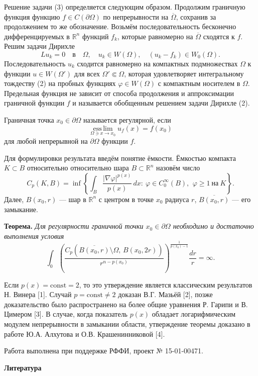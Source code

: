 Решение задачи (3) определяется следующим образом. Продолжим граничную функция функцию $f\in C(\partial \Omega)$ по непрерывности на $\overline{\Omega}$, сохранив за продолжением то же обозначение. Возьмём последовательность бесконечно дифференцируемых в $\mathbb{R}^n$ функций $f_k$, которые равномерно на $\overline{\Omega}$ сходятся к $f$. Решим задачи Дирихле
$$
Lu_k=0 \quad\text{в}\quad \Omega, \quad u_k \in W(\Omega), \quad (u_k-f_k)\in W_0(\Omega).
$$
Последовательность $u_k$ сходится равномерно  на компактных подмножествах $\Omega$ к функции $u\in W(\Omega')$ для всех $\Omega'\Subset \Omega$, которая удовлетворяет интегральному тождеству (2) на пробных функциях $\varphi \in W(\Omega)$ с компактным носителем в $\Omega$. Предельная функция не зависит от способа продолжения и аппроксимации граничной функции $f$ и называется обобщенным решением задачи Дирихле (2).

Граничная точка $x_0\in \partial \Omega$ называется регулярной, если
$$
\mathop{\mathrm{ess\,lim}}\limits_{\Omega \ni x\to x_0} u_f(x)= f(x_0)
$$
для любой непрерывной на $\partial \Omega$ функции $f$.

Для формулировки результата введём понятие ёмкости. Ёмкостью компакта $K\subset B$ относительно относительно шара $B\subset \mathbb{R}^n$ назовём число
$$
C_p (K, B)=\inf \left\{ \int_B \frac{|\nabla \varphi|^{p(x)}}{p(x)}\,dx:\ \varphi\in C_0^\infty(B),\ \,\varphi\geq 1\ \text{на}\ K \right\}.
$$
Далее, $B(x_0,r)$ --- шар в $\mathbb{R}^n$ с центром в точке $x_0$ радиуса $r$, $\overline{B(x_0,r)}$ --- его замыкание.

{\bf Теорема.} {\it Для регулярности граничной точки $x_0\in \partial \Omega$ необходимо и достаточно выполнения условия
$$
\int_0 \left( \frac{C_p \left(\overline{B(x_0,r)}\setminus \Omega,\, B(x_0,2r) \right)}{r^{n-p(x_0)}} \right)^\frac{1}{p(x_0)-1}\frac{dr}{r}=\infty.
$$
}

Если $p(x)=\mathrm{const}=2$, то это утверждение является классическим результатов Н. Винера [1]. Случай $p=\mathrm{const}\neq2$ доказан В.Г. Мазьёй [2], позже доказательство было распространено на более общие уравнения Р. Гарипи и В. Цимером [3]. В случае, когда показатель $p(x)$ обладает логарифмическим модулем непрерывности в замыкании области, утверждение теоремы  доказано в работе Ю.А. Алхутова и О.В. Крашенинниковой [4].

Работа выполнена при поддержке РФФИ, проект № 15-01-00471. %

\begin{center}
{\bf Литература}
\end{center}

